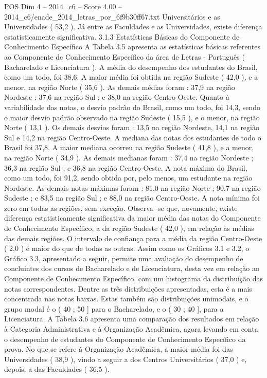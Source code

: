 \begin{textsample}{POS Dim 4 – 2014\_c6 – Score 4.00 – 2014\_c6/enade\_2014\_letras\_por\_6f9b30ff67.txt}
Universitários e as Universidades ( 53,2 ).
Já entre as Faculdades e as Universidades, existe diferença estatisticamente significativa. 3.1.3 Estatísticas Básicas do Componente de Conhecimento Específico A Tabela 3.5 apresenta as estatísticas básicas referentes ao Componente de Conhecimento Específico da área de Letras - Português ( Bacharelado e Licenciatura ).
A média do desempenho dos estudantes do Brasil, como um todo, foi 38,6.
A maior média foi obtida na região Sudeste ( 42,0 ), e a menor, na região Norte ( 35,6 ).
As demais médias foram : 37,9 na região Nordeste ; 37,6 na região Sul ; e 38,0 na região Centro-Oeste.
Quanto à variabilidade das notas, o desvio padrão do Brasil, como um todo, foi 14,3, sendo o maior desvio padrão observado na região Sudeste ( 15,5 ), e o menor, na região Norte ( 13,1 ).
Os demais desvios foram : 13,5 na região Nordeste, 14,1 na região Sul e 14,2 na região Centro-Oeste.
A mediana das notas dos estudantes de todo o Brasil foi 37,8.
A maior mediana ocorreu na região Sudeste ( 41,8 ), e a menor, na região Norte ( 34,9 ).
As demais medianas foram : 37,4 na região Nordeste ; 36,3 na região Sul ; e 36,8 na região Centro-Oeste.
A nota máxima do Brasil, como um todo, foi 91,2, sendo obtida por, pelo menos, um estudante na região Nordeste.
As demais notas máximas foram : 81,0 na região Norte ; 90,7 na região Sudeste ; e 83,5 na região Sul ; e 88,0 na região Centro-Oeste.
A nota mínima foi zero em todas as regiões, sem exceção.
Observa -se que, novamente, existe diferença estatisticamente significativa da maior média das notas do Componente de Conhecimento Específico, a da região Sudeste ( 42,0 ), em relação às médias das demais regiões.
O intervalo de confiança para a média da região Centro-Oeste ( 2,0 ) é maior do que de todas as outras.
Assim como os Gráficos 3.1 e 3.2, o Gráfico 3.3, apresentado a seguir, permite uma avaliação do desempenho de concluintes dos cursos de Bacharelado e de Licenciatura, desta vez em relação ao Componente de Conhecimento Específico, com um histograma da distribuição das notas correspondentes.
Dentre as três distribuições apresentadas, esta é a mais concentrada nas notas baixas.
Estas também são distribuições unimodais, e o grupo modal é o ( 40 ; 50 ] para o Bacharelado, e o ( 30 ; 40 ], para a Licenciatura.
A Tabela 3.6 apresenta uma comparação dos resultados em relação à Categoria Administrativa e à Organização Acadêmica, agora levando em conta o desempenho de estudantes do Componente de Conhecimento Específico da prova.
No que se refere à Organização Acadêmica, a maior média foi das Universidades ( 38,9 ), vindo a seguir a dos Centros Universitários ( 37,0 ) e, depois, a das Faculdades ( 36,5 ).

\end{textsample}

